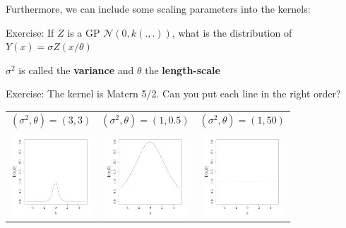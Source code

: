 \documentclass{beamer}
\begin{document}
\begin{frame}{}
Furthermore, we can include some scaling parameters into the kernels:
\begin{exampleblock}{Exercise:}
If $Z$ is a GP $\mathcal{N}(0,k(.,.))$, what is the distribution of $Y(x) = \sigma Z(x/\theta)$
\end{exampleblock}
\vspace{5mm}
$\sigma^2$ is called the \textbf{variance} and $\theta$ the \textbf{length-scale}
\end{frame}

\begin{frame}{}
\begin{exampleblock}{Exercise: }
The kernel is Matern 5/2. Can you put each line in the right order?
\begin{center}
\begin{tabular}{ccc}
$(\sigma^2,\theta) = (3,3)$& $(\sigma^2,\theta)=(1,0.5)$& $(\sigma^2,\theta)=(1,50)$ \\ 
&&\\
\includegraphics[height=3cm]{figures/R/MVN_kern105} &\includegraphics[height=3cm]{figures/R/MVN_kern33}& \includegraphics[height=3cm]{figures/R/MVN_kern150}\\ 

\end{tabular}
\end{center}
\end{exampleblock}
\end{frame}
\end{document}
